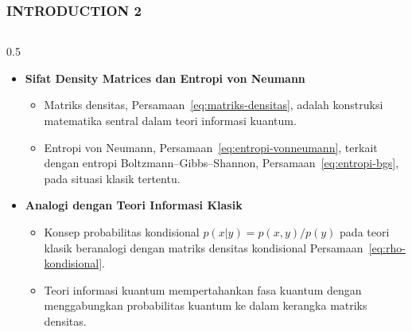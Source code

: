 \begin{frame}
    \frametitle{INTRODUCTION 2}
    \vspace*{-0.5cm}
    \begin{columns}[T]
        \small
        \begin{column}{0.5\textwidth}
            \begin{itemize}\tiny\justifying
                \item \textbf{Sifat Density Matrices dan Entropi von Neumann}
                    \begin{itemize}\tiny\justifying
                        \item[$\Rightarrow$] Matriks densitas, Persamaan~\ref{eq:matriks-densitas},
                            adalah konstruksi matematika sentral dalam teori informasi kuantum.
                        \item[$\Rightarrow$] Entropi von Neumann,
                            Persamaan~\ref{eq:entropi-vonneumann}, terkait dengan entropi
                            Boltzmann--Gibbs--Shannon, Persamaan~\ref{eq:entropi-bgs},
                            pada situasi klasik tertentu.
                    \end{itemize}
                \item \textbf{Analogi dengan Teori Informasi Klasik}
                    \begin{itemize}\tiny\justifying
                        \item[$\Rightarrow$] Konsep probabilitas kondisional
                            $p(x|y)=p(x,y)/p(y)$ pada teori klasik beranalogi dengan
                            matriks densitas kondisional
                            Persamaan~\ref{eq:rho-kondisional}.
                        \item[$\Rightarrow$] Teori informasi kuantum mempertahankan fasa
                            kuantum dengan menggabungkan probabilitas kuantum ke dalam
                            kerangka matriks densitas.
                    \end{itemize}
            \end{itemize}
        \end{column}


\end{columns}
\end{frame}

